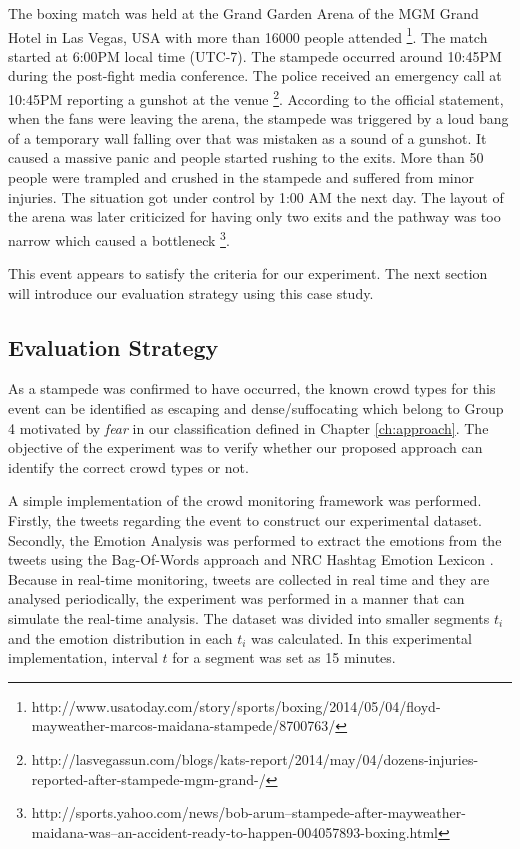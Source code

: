 The boxing match was held at the Grand Garden Arena of the MGM Grand Hotel in Las Vegas, USA with more than 16000 people attended \footnote{http://www.usatoday.com/story/sports/boxing/2014/05/04/floyd-mayweather-marcos-maidana-stampede/8700763/}. The match started at 6:00PM local time (UTC-7). The stampede occurred around 10:45PM during the post-fight media conference. The police received an emergency call at 10:45PM reporting a gunshot at the venue \footnote{http://lasvegassun.com/blogs/kats-report/2014/may/04/dozens-injuries-reported-after-stampede-mgm-grand-/}. According to the official statement, when the fans were leaving the arena, the stampede was triggered by a loud bang of a temporary wall falling over that was mistaken as a sound of a gunshot. It caused a massive panic and people started rushing to the exits. More than 50 people were trampled and crushed in the stampede and suffered from minor injuries. The situation got under control by 1:00 AM the next day. The layout of the arena was later criticized for having only two exits and the pathway was too narrow which caused a bottleneck \footnote{http://sports.yahoo.com/news/bob-arum--stampede-after-mayweather-maidana-was--an-accident-ready-to-happen-004057893-boxing.html}.

This event appears to satisfy the criteria for our experiment. The next section will introduce our evaluation strategy using this case study.

\subsection{Evaluation Strategy}

As a stampede was confirmed to have occurred, the known crowd types for this event can be identified as escaping and dense/suffocating which belong to Group 4 motivated by \textit{fear} in our classification defined in Chapter \ref{ch:approach}. The objective of the experiment was to verify whether our proposed approach can identify the correct crowd types or not.

A simple implementation of the crowd monitoring framework was performed. Firstly, the tweets regarding the event to construct our experimental dataset. Secondly, the Emotion Analysis was performed to extract the emotions from the tweets using the Bag-Of-Words approach and NRC Hashtag Emotion Lexicon \parencite{mohammad2014using}. Because in real-time monitoring, tweets are collected in real time and they are analysed periodically, the experiment was performed in a manner that can simulate the real-time analysis. The dataset was divided into smaller segments \(t_i\) and the emotion distribution in each \(t_i\) was calculated. In this experimental implementation, interval \(t\) for a segment was set as 15 minutes.

